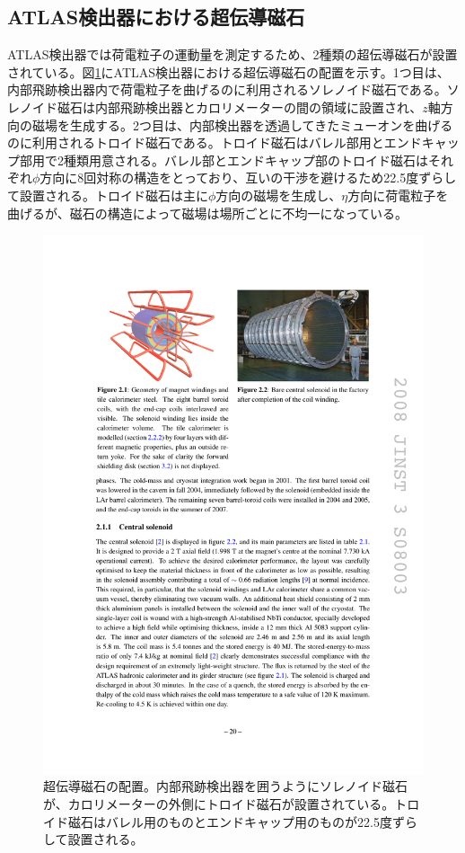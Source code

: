 \subsection{ATLAS検出器における超伝導磁石}
\label{subsec_magnet}
ATLAS検出器では荷電粒子の運動量を測定するため、2種類の超伝導磁石が設置されている。図\ref{ATLASmagnet}にATLAS検出器における超伝導磁石の配置を示す。1つ目は、内部飛跡検出器内で荷電粒子を曲げるのに利用されるソレノイド磁石である。ソレノイド磁石は内部飛跡検出器とカロリメーターの間の領域に設置され、$z$軸方向の磁場を生成する。2つ目は、内部検出器を透過してきたミューオンを曲げるのに利用されるトロイド磁石である。トロイド磁石はバレル部用とエンドキャップ部用で2種類用意される。バレル部とエンドキャップ部のトロイド磁石はそれぞれ$\phi$方向に8回対称の構造をとっており、互いの干渉を避けるため22.5度ずらして設置される。トロイド磁石は主に$\phi$方向の磁場を生成し、$\eta$方向に荷電粒子を曲げるが、磁石の構造によって磁場は場所ごとに不均一になっている。

\begin{figure} 
    \centering
    \includegraphics[width=12cm]{fig/Intro/ATLASmagnet.pdf}
    \caption[超伝導磁石の配置]{超伝導磁石の配置\cite{JINST:2008}。内部飛跡検出器を囲うようにソレノイド磁石が、カロリメーターの外側にトロイド磁石が設置されている。トロイド磁石はバレル用のものとエンドキャップ用のものが22.5度ずらして設置される。}
    \label{ATLASmagnet}
\end{figure}

